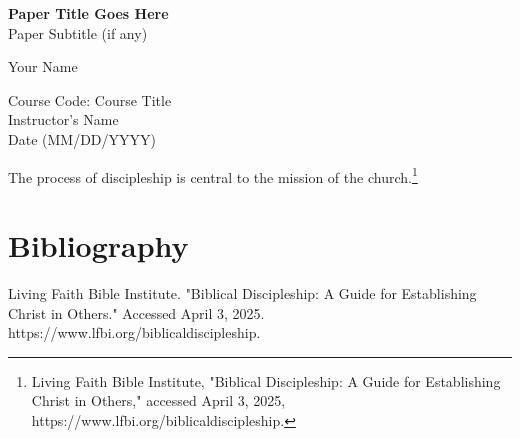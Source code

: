 \documentclass[12pt]{article}
\begin{document}
\thispagestyle{empty}

\vspace*{2in}

\begin{center}
    \textbf{Paper Title Goes Here} \\
    Paper Subtitle (if any)
    
    \vspace{10em}

    Your Name
\end{center}

\vfill

\begin{center}
    Course Code: Course Title \\
    Instructor’s Name \\
    Date (MM/DD/YYYY)
\end{center}

\newpage

\setcounter{page}{1}

The process of discipleship is central to the mission of the church.\footnote{Living Faith Bible Institute, "Biblical Discipleship: A Guide for Establishing Christ in Others," accessed April 3, 2025, https://www.lfbi.org/biblicaldiscipleship.}


\newpage
\section*{Bibliography}

\begin{flushleft}
Living Faith Bible Institute. "Biblical Discipleship: A Guide for Establishing Christ in Others." Accessed April 3, 2025. https://www.lfbi.org/biblicaldiscipleship.
\end{flushleft}
\end{document}
